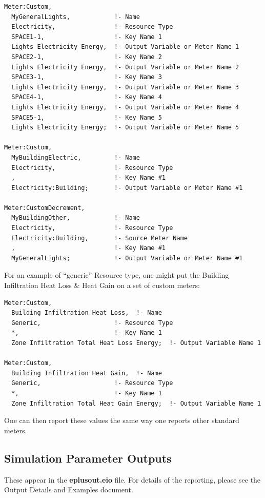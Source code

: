 \begin{lstlisting}
Meter:Custom,
  MyGeneralLights,            !- Name
  Electricity,                !- Resource Type
  SPACE1-1,                   !- Key Name 1
  Lights Electricity Energy,  !- Output Variable or Meter Name 1
  SPACE2-1,                   !- Key Name 2
  Lights Electricity Energy,  !- Output Variable or Meter Name 2
  SPACE3-1,                   !- Key Name 3
  Lights Electricity Energy,  !- Output Variable or Meter Name 3
  SPACE4-1,                   !- Key Name 4
  Lights Electricity Energy,  !- Output Variable or Meter Name 4
  SPACE5-1,                   !- Key Name 5
  Lights Electricity Energy;  !- Output Variable or Meter Name 5

Meter:Custom,
  MyBuildingElectric,         !- Name
  Electricity,                !- Resource Type
  ,                           !- Key Name #1
  Electricity:Building;       !- Output Variable or Meter Name #1

Meter:CustomDecrement,
  MyBuildingOther,            !- Name
  Electricity,                !- Resource Type
  Electricity:Building,       !- Source Meter Name
  ,                           !- Key Name #1
  MyGeneralLights;            !- Output Variable or Meter Name #1
\end{lstlisting}

For an example of ``generic'' Resource type, one might put the Building Infiltration Heat Loss \& Heat Gain on a set of custom meters:

\begin{lstlisting}
Meter:Custom,
  Building Infiltration Heat Loss,  !- Name
  Generic,                    !- Resource Type
  *,                          !- Key Name 1
  Zone Infiltration Total Heat Loss Energy;  !- Output Variable Name 1

Meter:Custom,
  Building Infiltration Heat Gain,  !- Name
  Generic,                    !- Resource Type
  *,                          !- Key Name 1
  Zone Infiltration Total Heat Gain Energy;  !- Output Variable Name 1
\end{lstlisting}

One can then report these values the same way one reports other standard meters.

\subsection{Simulation Parameter Outputs}\label{simulation-parameter-outputs}

These appear in the \textbf{eplusout.eio} file. For details of the reporting, please see the Output Details and Examples document.
